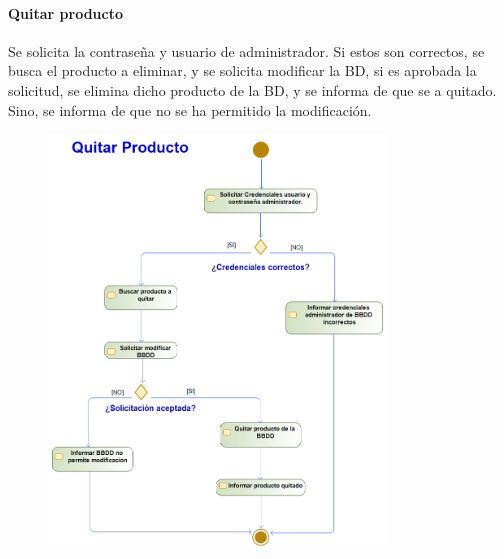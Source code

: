 \paragraph{Quitar producto}
Se solicita la contraseña y usuario de administrador. Si estos son correctos, se busca el producto a eliminar, y se solicita modificar la BD, si es aprobada la solicitud, se elimina dicho producto de la BD, y se informa de que se a quitado. Sino, se informa de que no se ha permitido la modificación.
\begin{figure}[H]
    \centering
    \includegraphics[width=0.8\textwidth]{Use_Cases/ProyectoIS_QuitarProducto.png}
\end{figure}
\newpage
